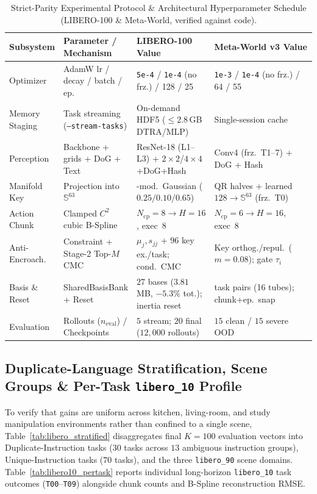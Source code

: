\documentclass[10pt]{article}
\newcommand{\tblfont}{\fontsize{8.5pt}{10.4pt}\selectfont}
\begin{document}
\begin{table}[ht!]
  \centering
  \caption{Strict-Parity Experimental Protocol \& Architectural Hyperparameter Schedule (LIBERO-100 \& Meta-World, verified against code).}
  \label{tab:hyperparams}
  \tblfont
  \setlength{\tabcolsep}{3.6pt}
  \begin{tabular}{>{\raggedright\arraybackslash}p{}>{\raggedright\arraybackslash}p{}>{\raggedright\arraybackslash}p{}>{\raggedright\arraybackslash}p{}}
    \toprule
    \textbf{Subsystem} & \textbf{Parameter / Mechanism} & \textbf{LIBERO-100 Value} & \textbf{Meta-World v3 Value} \\
    \midrule
    Optimizer & AdamW lr / decay / batch / ep. & \texttt{5e-4} / \texttt{1e-4} (no frz.) / 128 / 25 & \texttt{1e-3} / \texttt{1e-4} (no frz.) / 64 / 55 \\
    Memory Staging & Task streaming (\texttt{--stream-tasks}) & On-demand HDF5 ($\le 2.8$\,GB DTRA/MLP) & Single-session cache \\
    Perception & Backbone + grids + DoG + Text & ResNet-18 (L1--L3) + $2{\times}2$/$4{\times}4$+DoG+Hash & Conv4 (frz.\ T1--7) + DoG + Hash \\
    Manifold Key & Projection into $\mathbb{S}^{63}$ & 3-mod.\ Gaussian ($0.25/0.10/0.65$) & QR halves + learned $128 \to \mathbb{S}^{63}$ (frz.\ T0) \\
    Action Chunk & Clamped $C^2$ cubic B-Spline & $N_{\text{cp}}=8 \to H=16$, exec~$8$ & $N_{\text{cp}}=6 \to H=16$, exec~$8$ \\
    Anti-Encroach. & Constraint + Stage-2 Top-$M$ CMC & $\mu_j, s_{jj}$ + $96$ key ex./task; cond.\ CMC & Key orthog./repul.\ ($m=0.08$); gate $\tau_i$ \\
    Basis \& Reset & SharedBasisBank + Reset & $27$ bases ($3.81$\,MB, $-5.3\%$ tot.); inertia reset & 8 task pairs (16 tubes); chunk+ep.\ snap \\
    Evaluation & Rollouts ($n_{\text{eval}}$) / Checkpoints & $5$ stream; $20$ final ($12{,}000$ rollouts) & $15$ clean / $15$ severe OOD \\
    \bottomrule
  \end{tabular}
\end{table}

\subsection{Duplicate-Language Stratification, Scene Groups \& Per-Task \texttt{libero\_10} Profile}
To verify that gains are uniform across kitchen, living-room, and study manipulation environments rather than confined to a single scene, Table~\ref{tab:libero_stratified} disaggregates final $K=100$ evaluation vectors into Duplicate-Instruction tasks ($30$ tasks across $13$ ambiguous instruction groups), Unique-Instruction tasks ($70$ tasks), and the three \texttt{libero\_90} scene domains. Table~\ref{tab:libero10_pertask} reports individual long-horizon \texttt{libero\_10} task outcomes (\texttt{T00}--\texttt{T09}) alongside chunk counts and B-Spline reconstruction RMSE.
\end{document}
